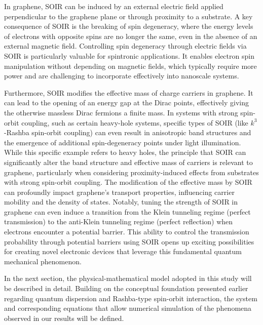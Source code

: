 In graphene, SOIR can be induced by an external electric field applied perpendicular to the graphene plane or through proximity to a substrate\cite{ShcherbakovSciAdv2021}.
A key consequence of SOIR is the breaking of spin degeneracy, where the energy levels of electrons with opposite spins are no longer the same, even in the absence of an external magnetic field\cite{DelkhoshPhysE2015}.
Controlling spin degeneracy through electric fields via SOIR is particularly valuable for spintronic applications.
It enables electron spin manipulation without depending on magnetic fields, which typically require more power and are challenging to incorporate effectively into nanoscale systems.


Furthermore, SOIR modifies the effective mass of charge carriers in graphene\cite{WangPhysRevX2016}.
It can lead to the opening of an energy gap at the Dirac points, effectively giving the otherwise massless Dirac fermions a finite mass.
In systems with strong spin-orbit coupling, such as certain heavy-hole systems, specific types of SOIR (like $k^3$-Rashba spin-orbit coupling) can even result in anisotropic band structures and the emergence of additional spin-degeneracy points under light illumination.
While this specific example refers to heavy holes, the principle that SOIR can significantly alter the band structure and effective mass of carriers is relevant to graphene, particularly when considering proximity-induced effects from substrates with strong spin-orbit coupling\cite{GindikinPhysRevB2025}.
The modification of the effective mass by SOIR can profoundly impact graphene's transport properties, influencing carrier mobility and the density of states.
Notably, tuning the strength of SOIR in graphene can even induce a transition from the Klein tunneling regime (perfect transmission) to the anti-Klein tunneling regime (perfect reflection) when electrons encounter a potential barrier.
This ability to control the transmission probability through potential barriers using SOIR opens up exciting possibilities for creating novel electronic devices that leverage this fundamental quantum mechanical phenomenon\cite{YaoMater2024}.

In the next section, the physical-mathematical model adopted in this study will be described in detail.
Building on the conceptual foundation presented earlier regarding quantum dispersion and Rashba-type spin-orbit interaction, the system and corresponding equations that allow numerical simulation of the phenomena observed in our results will be defined.


